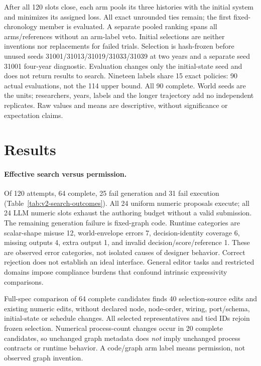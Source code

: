 \documentclass{article}
\begin{document}
After all 120 slots close, each arm pools its three histories with the initial
system and minimizes its assigned loss. All exact unrounded ties remain; the
first fixed-chronology member is evaluated. A separate pooled ranking spans
all arms/references without an arm-label veto. Initial selections are neither
inventions nor replacements for failed trials. Selection is hash-frozen before
unused seeds 31001/31013/31019/31033/31039 at two years and a separate seed 31001
four-year diagnostic. Evaluation changes only the initial-state seed and does
not return results to search. Nineteen labels share 15 exact policies: 90 actual
evaluations, not the 114 upper bound. All 90 complete. World seeds are the units;
researchers, years, labels and the longer trajectory add no independent replicates.
Raw values and means are descriptive, without significance or expectation claims.

\section{Results}
\label{sec:results}

\paragraph{Effective search versus permission.}
Of 120 attempts, 64 complete, 25 fail generation and 31 fail execution
(Table~\ref{tab:v2-search-outcomes}). All 24 uniform numeric proposals execute;
all 24 LLM numeric slots exhaust the authoring budget without a valid submission.
The remaining generation failure is fixed-graph code. Runtime categories are
scalar-shape misuse 12, world-envelope errors 7, decision-identity coverage 6,
missing outputs 4, extra output 1, and invalid decision/score/reference 1.
These are observed error categories, not isolated causes of designer behavior.
Correct rejection does not establish an ideal interface. General editor tasks
and restricted domains impose compliance burdens that confound intrinsic
expressivity comparisons.

Full-spec comparison of 64 complete candidates finds 40 selection-source edits
and existing numeric edits, without declared node, node-order, wiring,
port/schema, initial-state or schedule changes. All selected representatives
and tied IDs rejoin frozen selection. Numerical process-count changes occur
in 20 complete candidates, so unchanged graph metadata does \emph{not} imply
unchanged process contracts or runtime behavior. A code/graph arm label means
permission, not observed graph invention.
\end{document}
